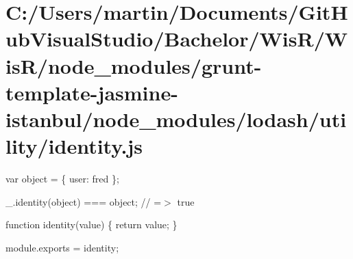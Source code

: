 \hypertarget{_c_1_2_users_2martin_2_documents_2_git_hub_visual_studio_2_bachelor_2_wis_r_2_wis_r_2node_module4e61b1fe888b9cbb63d54e56b2ffa647}{}\section{C\+:/\+Users/martin/\+Documents/\+Git\+Hub\+Visual\+Studio/\+Bachelor/\+Wis\+R/\+Wis\+R/node\+\_\+modules/grunt-\/template-\/jasmine-\/istanbul/node\+\_\+modules/lodash/utility/identity.\+js}
var object = \{ \textquotesingle{}user\textquotesingle{}\+: \textquotesingle{}fred\textquotesingle{} \};

\+\_\+.\+identity(object) === object; // =$>$ true


\begin{DoxyCodeInclude}

\textcolor{keyword}{function} identity(value) \{
  \textcolor{keywordflow}{return} value;
\}

module.exports = identity;
\end{DoxyCodeInclude}
 